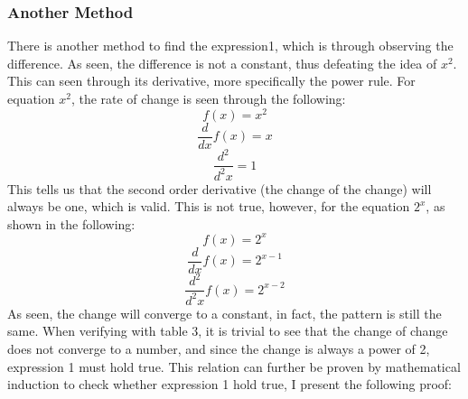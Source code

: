 \documentclass[12pt,a4paper]{article}
\begin{document}
	\subsubsection{Another Method}
	There is another method to find the expression1, which is through observing the difference. As seen, the difference is not a constant, thus defeating the idea of $x^2$. This can seen through its derivative, more specifically the power rule. \newline
	For equation $x^2$, the rate of change is seen through the following:
	\begin{equation}
		f(x) = x^2
	\end{equation}
	\begin{equation}
		\frac{d}{dx} f(x)= x
	\end{equation}
	\begin{equation}
		\frac{d^2}{d^2x} = 1
	\end{equation}
	This tells us that the second order derivative (the change of the change) will always be one, which is valid.\newline
	This is not true, however, for the equation $2^x$, as shown in the following:
	\begin{equation}
		f(x) = 2^x
	\end{equation}
	\begin{equation}
		\frac{d}{dx} f(x)= 2^{x-1}
	\end{equation}
	\begin{equation}
		\frac{d^2}{d^2x} f(x)= 2^{x-2}
	\end{equation}
	As seen, the change will converge to a constant, in fact, the pattern is still the same. When verifying with table 3, it is trivial to see that the change of change does not converge to a number, and since the change is always a power of 2, expression 1 must hold true. \newline
	This relation can further be proven by mathematical induction to check whether expression 1 hold true, I present the following proof:
\end{document}
